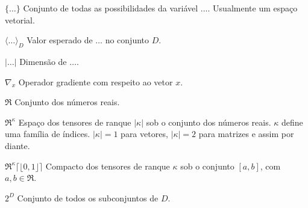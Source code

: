 \begin{simbolos}
  \item[$ \{\ldots\} $] Conjunto de todas as possibilidades da variável $\ldots$. Usualmente um espaço vetorial.

  \item[$ \langle \ldots \rangle_{D} $] Valor esperado de $\ldots$ no conjunto $D$.

  \item[$| \ldots |$] Dimensão de $\ldots$.

  \item[$\nabla_{x}$] Operador gradiente com respeito ao vetor $x$.
    
  \item[$\Re$] Conjunto dos números reais.
  
  \item[$\Re^{\kappa}$] Espaço dos tensores de ranque $|\kappa|$ sob o conjunto dos números reais. $\kappa$ define uma família de índices. $|\kappa| = 1$ para vetores, $|\kappa| = 2$ para matrizes e assim por diante.
  
  \item[$ \Re^{\kappa} \lceil \!\!\! \lfloor0,1 \rfloor \!\!\! \rceil $] Compacto dos tensores de ranque $\kappa$ sob o conjunto $[a,b]$, com $a, b \in \Re$. 
  
  \item[$2^D$] Conjunto de todos os subconjuntos de $D$. 
   
\end{simbolos}
